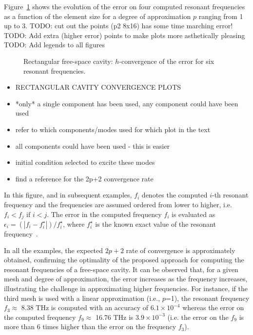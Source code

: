 Figure~\ref{fig:rectangle2DfreeSpace_Convergence} shows the evolution of the error on four computed resonant frequencies as a function of the element size for a degree of approximation $p$ ranging from 1 up to 3.
TODO: cut out the points (p2 8x16) has some time marching error!
TODO: Add extra (higher error) points to make plots more asthetically pleasing
TODO: Add legends to all figures
\begin{figure}[!ht]
	\centering

	\caption{Rectangular free-space cavity: $h$-convergence of the error for six resonant frequencies.}
	\label{fig:rectangle2DfreeSpace_Convergence}
\end{figure}
\begin{itemize}
\item RECTANGULAR CAVITY CONVERGENCE PLOTS
\item *only* a single component has been used, any component could have been used
\item refer to which components/modes used for which plot in the text
\item all components could have been used - this is easier
\item initial condition selected to excite these modes
\item find a reference for the 2p+2 convergence rate
\end{itemize}
In this figure, and in subsequent examples, $f_i$ denotes the computed $i$-th resonant frequency and the frequencies are assumed ordered from lower to higher, i.e. $f_i < f_j$ if $i<j$. The error in the computed frequency $f_i$ is evaluated as $\epsilon_i = (|f_i - f_i^\star|)/f_i^\star$, where $f_i^\star$ is the known exact value of the resonant frequency~\cite{BalanisBook}.

In all the examples, the expected $2p+2$ rate of convergence is approximately obtained, confirming the optimality of the proposed approach for computing the resonant frequencies of a free-space cavity. It can be observed that, for a given mesh and degree of approximation, the error increases as the frequency increases, illustrating the challenge in approximating higher frequencies. For instance, if the third mesh is used with a linear approximation (i.e., $p$=1), the resonant frequency $f_3 \approx$  8.38 THz is computed with an accuracy of $6.1 \times 10^{-4}$ whereas the error on the computed frequency $f_9 \approx$ 16.76 THz is $3.9 \times 10^{-3}$ (i.e. the error on the $f_9$ is more than 6 times higher than the error on the frequency $f_3$).

